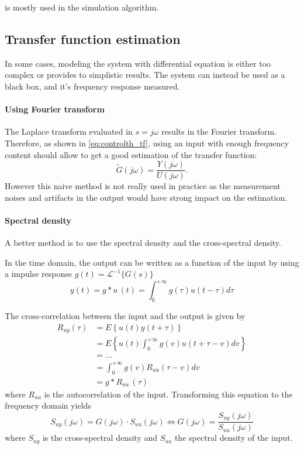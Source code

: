  is mostly used in the simulation algorithm.

\subsection{Transfer function estimation}
In some cases, modeling the system with differential equation is either too complex or provides to simplistic results. The system can instead be used as a black box, and it's frequency response measured.

\paragraph{Using Fourier transform}
The Laplace transform evaluated in $s=j\omega$ results in the Fourier transform. Therefore, as shown in \cref{eq:controlth_tf}, using an input with enough frequency content should allow to get a good estimation of the transfer function:
\begin{equation}
	\tilde{G}(j\omega) = \frac{Y(j\omega)}{U(j\omega)}.
\end{equation}
However this naive method is not really used in practice as the measurement noises and artifacts in the output would have strong impact on the estimation.

\paragraph{Spectral density}
A better method is to use the spectral density and the cross-spectral density.

In the time domain, the output can be written as a function of the input by using a impulse response $g(t) = \mathcal{L}^{-1}\{G(s)\}$
\begin{equation}
	y(t) = g * u\,(t) =  \int_0^{+\infty} g(\tau) u(t-\tau)d\tau
\end{equation}

The cross-correlation between the input and the output is given by
\begin{align}
R_{uy}(\tau) &= E \left\{ u(t) y(t+\tau)\right\} \nonumber\\
			 &= E \left\{ u(t) \int_0^{+\infty} g(v) u(t+\tau-v)dv\right\} \nonumber\\
			 &= ... \nonumber \\ 
			 &= \int_0^{+\infty} g(v) R_{uu}(\tau-v) dv \nonumber\\
			 &= g * R_{uu} \, (\tau)
\end{align}
where $R_{uu}$ is the autocorrelation of the input. Transforming this equation to the frequency domain yields
\begin{equation}
	S_{uy}(j\omega) = G(j\omega)\cdot S_{uu}(j\omega)   \iff 	G(j\omega) = \frac{S_{uy}(j\omega) }{ S_{uu}(j\omega)}
\end{equation}
where $S_{uy}$ is the cross-spectral density and $S_{uu}$ the spectral density of the input.

